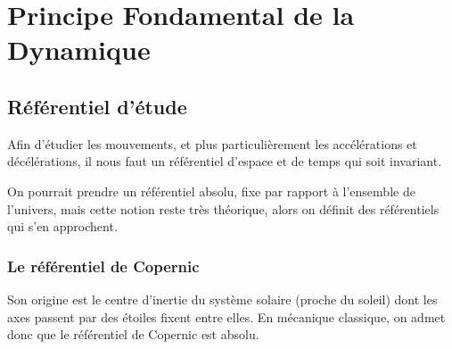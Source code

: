 \documentclass[12pt]{article}
\begin{document}
%

\section{Principe Fondamental de la Dynamique}

\subsection{Référentiel d'étude}

Afin d'étudier les mouvements, et plus particulièrement les accélérations et décélérations, il nous faut un référentiel d'espace et de temps qui soit invariant.

On pourrait prendre un référentiel absolu, fixe par rapport à l'ensemble de l'univers, mais cette notion reste très théorique, alors on définit des référentiels qui s'en approchent.

\subsubsection{Le référentiel de Copernic}

Son origine est le centre d'inertie du système solaire (proche du soleil) dont les axes passent par des étoiles fixent entre elles. En mécanique classique, on admet donc que le référentiel de Copernic est absolu.
\end{document}
